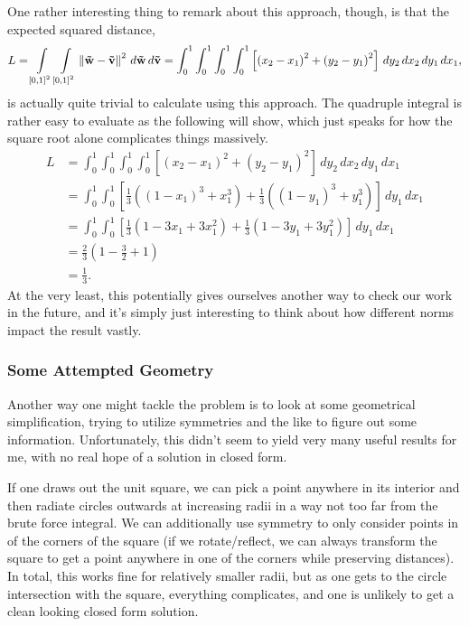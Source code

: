 One rather interesting thing to remark about this approach, though, is that the
expected squared distance,
\[
    L = \int\displaylimits_{\left[ 0, 1 \right]^2} \int\displaylimits_{\left[ 0, 1 \right]^2} \left\lVert \mathbf{\vec{w}} - \mathbf{\vec{v}} \right\rVert^2 \, d\mathbf{\vec{w}} \, d\mathbf{\vec{v}}
    = \int_{0}^{1} \int_{0}^{1} \int_{0}^{1} \int_{0}^{1} \left[ \left( x_2 - x_1 \right)^2 + \left( y_2 - y_1 \right)^2 \right] \, dy_2 \, dx_2 \, dy_1 \, dx_1
,\]
is actually quite trivial to calculate using this approach. The quadruple
integral is rather easy to evaluate as the following will show, which just
speaks for how the square root alone complicates things massively.
\begin{align*}
    L &= \int_{0}^{1} \int_{0}^{1} \int_{0}^{1} \int_{0}^{1} \left[ \left( x_2 - x_1 \right)^2 + \left( y_2 - y_1 \right)^2 \right] \, dy_2 \, dx_2 \, dy_1 \, dx_1 \\
    &= \int_{0}^{1} \int_{0}^{1} \left[ \frac{1}{3} \left( \left( 1 - x_1 \right)^3 + x_1^3 \right) + \frac{1}{3} \left( \left( 1 - y_1 \right)^3 + y_1^3 \right) \right] \, dy_1 \, dx_1 \\
    &= \int_{0}^{1} \int_{0}^{1} \left[ \frac{1}{3} \left( 1 - 3x_1 + 3x_1^2 \right) + \frac{1}{3} \left( 1 - 3y_1 + 3y_1^2 \right) \right] \, dy_1 \, dx_1 \\
    &= \frac{2}{3} \left( 1 - \frac{3}{2} + 1 \right) \\
    &= \frac{1}{3}
.\end{align*}
At the very least, this potentially gives ourselves another way to check our
work in the future, and it's simply just interesting to think about how
different norms impact the result vastly.

\subsubsection{Some Attempted Geometry}

Another way one might tackle the problem is to look at some geometrical
simplification, trying to utilize symmetries and the like to figure out some
information. Unfortunately, this didn't seem to yield very many useful results
for me, with no real hope of a solution in closed form.

If one draws out the unit square, we can pick a point anywhere in its interior
and then radiate circles outwards at increasing radii in a way not too far from
the brute force integral. We can additionally use symmetry to only consider
points in of the corners of the square (if we rotate/reflect, we can always
transform the square to get a point anywhere in one of the corners while
preserving distances). In total, this works fine for relatively smaller radii,
but as one gets to the circle intersection with the square, everything
complicates, and one is unlikely to get a clean looking closed form solution.

